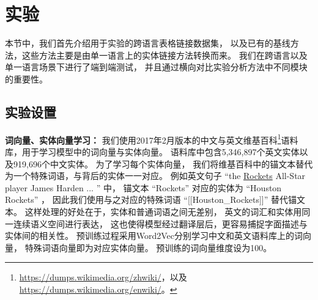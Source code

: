 \section{实验}
\label{sec:tabel-eval}


本节中，我们首先介绍用于实验的跨语言表格链接数据集，
以及已有的基线方法，这些方法主要是由单一语言上的实体链接方法转换而来。
我们在跨语言以及单一语言场景下进行了端到端测试，
并且通过横向对比实验分析方法中不同模块的重要性。


\subsection{实验设置}
\label{sec:tabel-exp-setup}



\textbf{词向量、实体向量学习：}
我们使用2017年2月版本的中文与英文维基百科\footnote{
\url{https://dumps.wikimedia.org/zhwiki/}，以及\url{https://dumps.wikimedia.org/enwiki/}。
}语料库，用于学习模型中的词向量与实体向量。
语料库中包含5,346,897个英文实体以及919,696个中文实体。
为了学习每个实体向量，
我们将维基百科中的锚文本替代为一个特殊词语，与背后的实体一一对应。
例如英文句子 ``the \underline{Rockets} All-Star player James Harden ... '' 中，
锚文本 ``Rockets'' 对应的实体为 ``Houston Rockets'' ，
因此我们使用与之对应的特殊词语 ``[[Houston\_Rockets]]'' 替代锚文本。
这样处理的好处在于，实体和普通词语之间无差别，
英文的词汇和实体用同一连续语义空间进行表达，
这也使得模型经过翻译层后，更容易捕捉字面描述与实体间的相关性。
预训练过程采用Word2Vec\parencite{mikolov2013distributed}分别学习中文和英文语料库上的词向量，
特殊词语向量即为对应实体向量。
预训练的词向量维度设为100。

